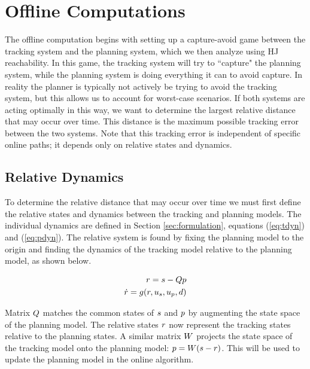 \section{Offline Computations \label{sec:precomp}}
The offline computation begins with setting up a capture-avoid game between the tracking system and the planning system, which we then analyze using HJ reachability. In this game, the tracking system will try to ``capture" the planning system, while the planning system is doing everything it can to avoid capture. In reality the planner is typically not actively be trying to avoid the tracking system, but this allows us to account for worst-case scenarios. If both systems are acting optimally in this way, we want to determine the largest relative distance that may occur over time. This distance is the maximum possible tracking error between the two systems. Note that this tracking error is independent of specific online paths; it depends only on relative states and dynamics.

\subsection{Relative Dynamics}
To determine the relative distance that may occur over time we must first define the relative states and dynamics between the tracking and planning models. The individual dynamics are defined in Section \ref{sec:formulation}, equations (\ref{eq:tdyn}) and (\ref{eq:pdyn}). The relative system is found by fixing the planning model to the origin and finding the dynamics of the tracking model relative to the planning model, as shown below.

\begin{equation}
\label{eq:rdyn}
\begin{aligned}
r = s - Qp\\
\dot{r} = g(r, u_s, u_p, d)
\end{aligned}
\end{equation}

Matrix $Q$ matches the common states of $s$ and $p$ by augmenting the state space of the planning model. The relative states $r$ now represent the tracking states relative to the planning states. A similar matrix $W$ projects the state space of the tracking model onto the planning model: $p = W(s-r)$. This will be used to update the planning model in the online algorithm.

